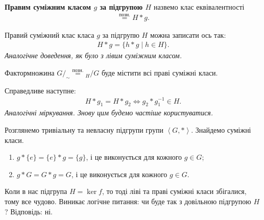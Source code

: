 \documentclass{math_library}
\begin{document}
\begin{definition}
\textbf{Правим суміжним класом $g$ за підгрупою $H$} назвемо клас еквівалентності
\begin{align*}
[g] \overset{позн.}{=} H*g.
\end{align*}
\end{definition}

\begin{proposition}
Правий суміжний клас класа $g$ за підгрупю $H$ можна записати ось так:
\begin{align*}
H*g = \{ h*g \mid h \in H \}.
\end{align*}
\textit{Аналогічне доведення, як було з лівим суміжним класом.}
\end{proposition}

Фактормножина $G/_{\sim} \overset{\text{позн.}}{=} {}_{H}{/G}$ буде містити всі праві суміжні класи.

\begin{proposition}
Справедливе наступне:
\begin{align*}
H * g_1 = H * g_2 \iff g_2*g_1^{-1} \in H.
\end{align*}
\textit{Аналогічні міркування. Знову цим будемо частіше користуватися.}
\end{proposition}

\begin{example}
\label{trivial_cosets}
Розглянемо тривіальну та невласну підгрупи групи $\left<G,* \right>$. Знайдемо суміжні класи.
\begin{enumerate}[nosep,wide=0pt,label={\arabic*)}]
\item $g*\{e\} = \{e\}*g = \{g\}$, і це виконується для кожного $g \in G$;
\item $g*G = G*g = G$, і це виконується для кожного $g \in G$.
\end{enumerate}
\end{example}

Коли в нас підгрупа $H = \ker f$, то тоді ліві та праві суміжні класи збігалися, тому все чудово. Виникає логічне питання: чи буде так з довільною підгрупою $H$? Відповідь: ні.
\end{document}
